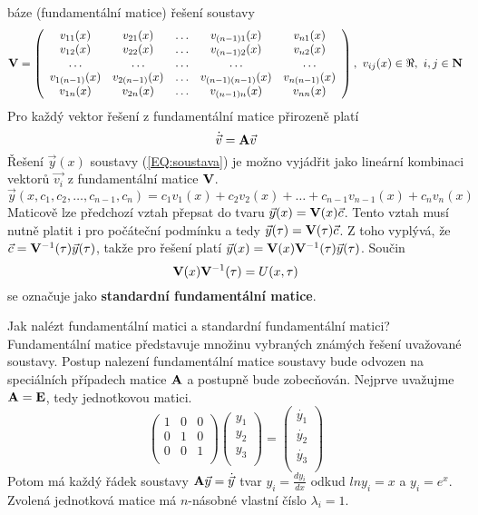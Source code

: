 báze (fundamentální matice) řešení soustavy%
\[
 {\bf V} = 
  \left(
    \begin{array}{ccccc}
     v_{11}(x) & v_{21}(x) & \ldots & v_{(n-1)1}(x) & v_{n1}(x) \\
     v_{12}(x) & v_{22}(x) & \ldots & v_{(n-1)2}(x) & v_{n2}(x) \\
     \ldots & \ldots & \ldots & \ldots & \ldots \\
     v_{1(n-1)}(x) & v_{2(n-1)}(x) & \ldots & v_{(n-1)(n-1)}(x) & v_{n(n-1)}(x) \\
     v_{1n}(x) & v_{2n}(x) & \ldots & v_{(n-1)n}(x) & v_{nn}(x) \\
    \end{array}
  \right),~v_{ij}(x)\in\Re,~i,j\in{\bf N}%
\]
Pro každý vektor řešení z fundamentální matice přirozeně platí
\[
 \dot{\vec{v}} = {\bf A} \vec{v}
\]
Řešení $\vec{y}(x)$ soustavy (\ref{EQ:soustava}) %
je možno vyjádřit jako lineární kombinaci  vektorů $\vec{v_i}$ z fundamentální matice ${\bf V}$.
\[
 \vec{y}(x,c_1,c_2,\ldots,c_{n-1},c_n) = c_1 v_1(x) + c_2 v_2(x) + \ldots + c_{n-1}v_{n-1}(x) + c_{n} v_{n}(x)
\]
Maticově lze předchozí vztah přepsat do tvaru
$ \vec{y}(x)= {\bf V}(x)\vec{c}$.
Tento vztah musí nutně platit i pro počáteční podmínku a tedy
$ \vec{y}(\tau) = {\bf V}(\tau)\vec{c}$. Z toho vyplývá, že $\vec{c} = {\bf V}^{-1}(\tau)\vec{y}(\tau)$, takže pro řešení platí $\vec{y}(x)= {\bf V}(x){\bf V}^{-1}(\tau)\vec{y}(\tau)$. Součin
\[
 {\bf V}(x){\bf V}^{-1}(\tau) = U(x,\tau)
\]
se označuje jako {\bf standardní fundamentální matice}.

Jak nalézt fundamentální matici a standardní fundamentální matici?\newline
Fundamentální matice představuje množinu vybraných známých řešení uvažované soustavy. Postup nalezení fundamentální matice soustavy bude odvozen na speciálních případech matice ${\bf A}$ a postupně bude zobecňován. Nejprve uvažujme ${\bf A} = {\bf E}$, tedy jednotkovou matici. 
\[
  \left(
    \begin{array}{ccc}
     1 & 0 & 0\\
     0 & 1 & 0\\
     0 & 0 & 1\\
    \end{array}
  \right) 
  \left(
    \begin{array}{c}
     y_1\\
     y_2\\
     y_3\\
    \end{array}
  \right) = 
  \left(
    \begin{array}{l}
     \dot{y_1}\\
     \dot{y_2}\\
     \dot{y_3}\\
    \end{array}
  \right)
\]
Potom má každý řádek soustavy ${\bf A}\vec{y} = \dot{\vec{y}}$ tvar $y_i = \frac{dy_i}{dx}$ odkud $ln{y_i} = x$ a $y_i = e^{x}$. Zvolená jednotková matice má $n$-násobné vlastní číslo $\lambda_i = 1$.

